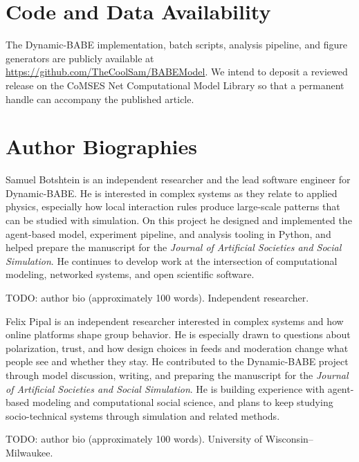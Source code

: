 \documentclass{JASSS}
\begin{document}
\section*{Code and Data Availability}
The Dynamic-BABE implementation, batch scripts, analysis pipeline, and figure generators are publicly available at \url{https://github.com/TheCoolSam/BABEModel}. We intend to deposit a reviewed release on the CoMSES Net Computational Model Library so that a permanent handle can accompany the published article.

\section*{Author Biographies}
\begin{description*}
\item[Samuel Botshtein.] Samuel Botshtein is an independent researcher and the lead software engineer for Dynamic-BABE. He is interested in complex systems as they relate to applied physics, especially how local interaction rules produce large-scale patterns that can be studied with simulation. On this project he designed and implemented the agent-based model, experiment pipeline, and analysis tooling in Python, and helped prepare the manuscript for the \emph{Journal of Artificial Societies and Social Simulation}. He continues to develop work at the intersection of computational modeling, networked systems, and open scientific software.
\item[Aurnob Ghose.] TODO: author bio (approximately 100 words). Independent researcher.
\item[Felix Pipal.] Felix Pipal is an independent researcher interested in complex systems and how online platforms shape group behavior. He is especially drawn to questions about polarization, trust, and how design choices in feeds and moderation change what people see and whether they stay. He contributed to the Dynamic-BABE project through model discussion, writing, and preparing the manuscript for the \emph{Journal of Artificial Societies and Social Simulation}. He is building experience with agent-based modeling and computational social science, and plans to keep studying socio-technical systems through simulation and related methods.
\item[Timothy Ehlinger.] TODO: author bio (approximately 100 words). University of Wisconsin--Milwaukee.
\end{description*}

\endparano

\theendnotes



\end{document}
